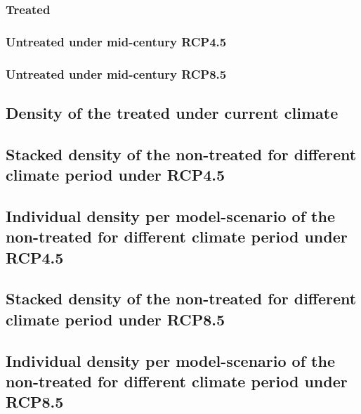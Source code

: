 \documentclass[12pt]{article}
\begin{document}
\subsubsection{Treated}




\subsubsection{Untreated under mid-century RCP4.5}




\subsubsection{Untreated under mid-century RCP8.5}




\subsection{Density of the treated under current climate}

\subsection{Stacked density of the non-treated for different climate period under RCP4.5}

\subsection{Individual density per model-scenario of the non-treated for different
  climate period under RCP4.5}

\subsection{Stacked density of the non-treated for different climate period under RCP8.5}

\subsection{Individual density per model-scenario of the non-treated for different
  climate period under RCP8.5}


% 
% 
\end{document}
